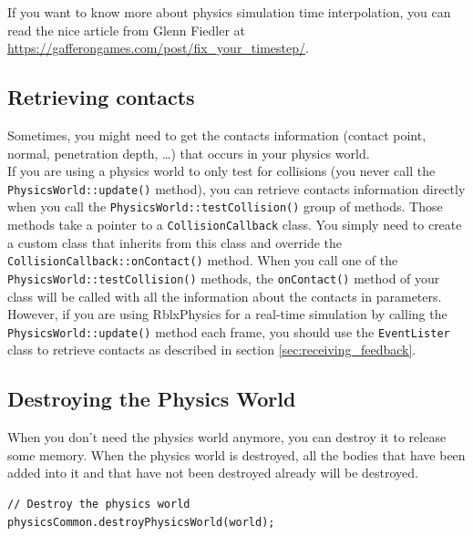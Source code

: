 \documentclass[a4paper,12pt]{article}
\begin{document}
    \vspace{0.6cm}

    If you want to know more about physics simulation time interpolation, you can read the nice article from Glenn Fiedler
    at \url{https://gafferongames.com/post/fix_your_timestep/}.

    \subsection{Retrieving contacts}

    Sometimes, you might need to get the contacts information (contact point, normal, penetration depth, \dots) that occurs in your physics world. \\

    If you are using a physics world to only test for collisions (you never call the \texttt{PhysicsWorld::update()} method), you can retrieve contacts
    information directly when you call the \texttt{PhysicsWorld::testCollision()} group of methods. Those methods take a pointer to a
    \texttt{CollisionCallback} class. You simply need to create a custom class that inherits from this class and override the
    \texttt{CollisionCallback::onContact()} method. When you call one of the \texttt{PhysicsWorld::testCollision()} methods, the \texttt{onContact()} method
    of your class will be called with all the information about the contacts in parameters. \\

    However, if you are using RblxPhysics for a real-time simulation by calling the \texttt{PhysicsWorld::update()} method each frame, you should
    use the \texttt{EventLister} class to retrieve contacts as described in section \ref{sec:receiving_feedback}.

    \subsection{Destroying the Physics World}

    When you don't need the physics world anymore, you can destroy it to release some memory. 
    When the physics world is destroyed, all the bodies that have been added into it and that have not been destroyed already will
    be destroyed. \\

    \begin{lstlisting}
// Destroy the physics world
physicsCommon.destroyPhysicsWorld(world);
    \end{lstlisting}
\end{document}
